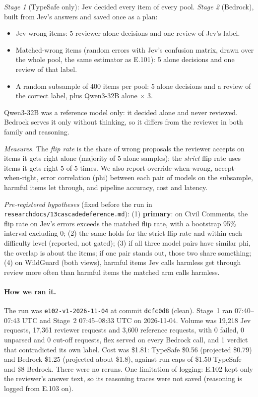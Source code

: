 \documentclass[11pt]{article}
\renewcommand{\_}{\origunderscore\allowbreak}
\begin{document}
\emph{Stage 1} (TypeSafe only): Jev decided every item of every pool. \emph{Stage 2} (Bedrock), built from Jev's answers and saved once as a plan:
\begin{itemize}[nosep]
  \item Jev-wrong items: 5 reviewer-alone decisions and one review of Jev's label.
  \item Matched-wrong items (random errors with Jev's confusion matrix, drawn over the whole pool, the same estimator as E.101): 5 alone decisions and one review of that label.
  \item A random subsample of 400 items per pool: 5 alone decisions and a review of the correct label, plus Qwen3-32B alone $\times$ 3.
\end{itemize}
Qwen3-32B was a reference model only: it decided alone and never reviewed. Bedrock serves it only without thinking, so it differs from the reviewer in both family and reasoning.

\emph{Measures.} The \emph{flip rate} is the share of wrong proposals the reviewer accepts on items it gets right alone (majority of 5 alone samples); the \emph{strict} flip rate uses items it gets right 5 of 5 times. We also report override-when-wrong, accept-when-right, error correlation (phi) between each pair of models on the subsample, harmful items let through, and pipeline accuracy, cost and latency.

\emph{Pre-registered hypotheses} (fixed before the run in \texttt{research\_docs/13\_cascade\_deference.md}):
(1) \textbf{primary}: on Civil Comments, the flip rate on Jev's errors exceeds the matched flip rate, with a bootstrap 95\% interval excluding 0;
(2) the same holds for the strict flip rate and within each difficulty level (reported, not gated);
(3) if all three model pairs have similar phi, the overlap is about the items; if one pair stands out, those two share something;
(4) on WildGuard (both views), harmful items Jev calls harmless get through review more often than harmful items the matched arm calls harmless.

\paragraph{How we ran it.}
The run was \texttt{e102-v1-2026-11-04} at commit \texttt{dcfc0d8} (clean). Stage~1 ran 07:40--07:43 UTC and Stage~2 07:45--08:33 UTC on 2026-11-04. Volume was 19,218 Jev requests, 17,361 reviewer requests and 3,600 reference requests, with 0 failed, 0 unparsed and 0 cut-off requests, flex served on every Bedrock call, and 1 verdict that contradicted its own label. Cost was \$1.81: TypeSafe \$0.56 (projected \$0.79) and Bedrock \$1.25 (projected about \$1.8), against run caps of \$1.50 TypeSafe and \$8 Bedrock. There were no reruns. One limitation of logging: E.102 kept only the reviewer's answer text, so its reasoning traces were not saved (reasoning is logged from E.103 on).
\end{document}

